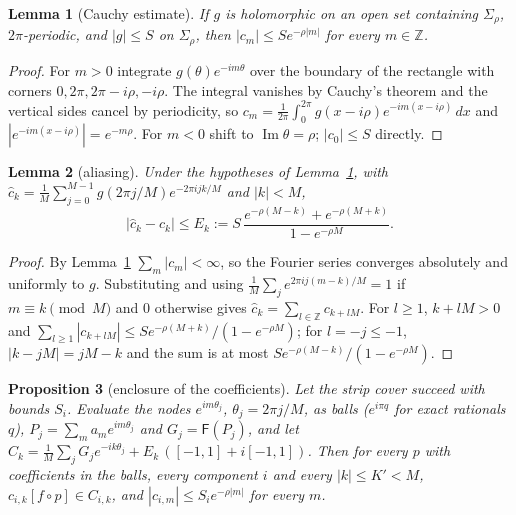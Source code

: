 \documentclass[11pt]{article}
\newtheorem{lemma}{Lemma}[section]
\newtheorem{proposition}[lemma]{Proposition}
\theoremstyle{definition}
\newcommand{\Z}{\mathbb{Z}}
\newcommand{\im}{\operatorname{Im}}
\begin{document}
\begin{lemma}[Cauchy estimate]\label{lem:cauchy}
If $g$ is holomorphic on an open set containing $\Sigma_\rho$, $2\pi$-periodic, and $|g| \le S$ on $\Sigma_\rho$, then $|c_m| \le S e^{-\rho|m|}$ for every $m \in \Z$.
\end{lemma}

\begin{proof}
For $m > 0$ integrate $g(\theta)e^{-im\theta}$ over the boundary of the rectangle with corners $0, 2\pi, 2\pi - i\rho, -i\rho$. The integral vanishes by Cauchy's theorem and the vertical sides cancel by periodicity, so $c_m = \frac{1}{2\pi}\int_0^{2\pi} g(x - i\rho)e^{-im(x - i\rho)}\,dx$ and $|e^{-im(x - i\rho)}| = e^{-m\rho}$. For $m < 0$ shift to $\im\theta = \rho$; $|c_0| \le S$ directly.
\end{proof}

\begin{lemma}[aliasing]\label{lem:alias}
Under the hypotheses of Lemma~\ref{lem:cauchy}, with $\hat c_k = \frac1M \sum_{j=0}^{M-1} g(2\pi j/M) e^{-2\pi ijk/M}$ and $|k| < M$,
\[ |\hat c_k - c_k| \le E_k := S\,\frac{e^{-\rho(M - k)} + e^{-\rho(M + k)}}{1 - e^{-\rho M}}. \]
\end{lemma}

\begin{proof}
By Lemma~\ref{lem:cauchy} $\sum_m |c_m| < \infty$, so the Fourier series converges absolutely and uniformly to $g$. Substituting and using $\frac1M\sum_j e^{2\pi ij(m-k)/M} = 1$ if $m \equiv k \pmod M$ and $0$ otherwise gives $\hat c_k = \sum_{l\in\Z} c_{k + lM}$. For $l \ge 1$, $k + lM > 0$ and $\sum_{l \ge 1}|c_{k+lM}| \le S e^{-\rho(M+k)}/(1 - e^{-\rho M})$; for $l = -j \le -1$, $|k - jM| = jM - k$ and the sum is at most $S e^{-\rho(M-k)}/(1 - e^{-\rho M})$.
\end{proof}

\begin{proposition}[enclosure of the coefficients]\label{prop:enclosure}
Let the strip cover succeed with bounds $S_i$. Evaluate the nodes $e^{im\theta_j}$, $\theta_j = 2\pi j/M$, as balls ($e^{i\pi q}$ for exact rationals $q$), $P_j = \sum_m a_m e^{im\theta_j}$ and $G_j = \mathsf F(P_j)$, and let $C_k = \frac1M\sum_j G_j e^{-ik\theta_j} + E_k\,([-1,1] + i[-1,1])$. Then for every $p$ with coefficients in the balls, every component $i$ and every $|k| \le K' < M$, $c_{i,k}[f \circ p] \in C_{i,k}$, and $|c_{i,m}| \le S_i e^{-\rho|m|}$ for every $m$.
\end{proposition}
\end{document}

